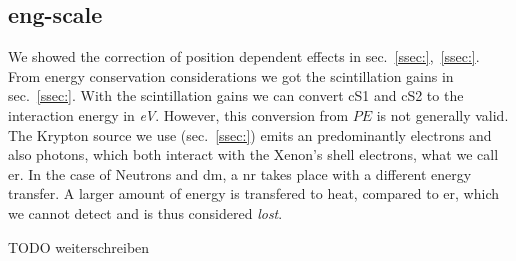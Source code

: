 
\FloatBarrier
\subsection{eng-scale}
\label{ssec:eng-scale}
\FloatBarrier


We showed the correction of position dependent effects in sec.~\ref{ssec:},~\ref{ssec:}.  %
From energy conservation considerations we got the scintillation gains in sec.~\ref{ssec:}.  %
With the scintillation gains we can convert cS1 and cS2 to the interaction energy in \textit{eV}.
However, this conversion from $ \mathit{PE} $ is not generally valid.
The Krypton source we use (sec.~\ref{ssec:}) emits an predominantly electrons and also photons, which both interact with the Xenon's shell electrons, what we call \gls{er}. %
In the case of Neutrons and \gls{dm}, a \gls{nr} takes place with a different energy transfer.
A larger amount of energy is transfered to heat, compared to \gls{er}, which we cannot detect and is thus considered \emph{lost}.

TODO weiterschreiben




